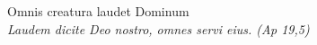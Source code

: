 


\def\greinitialformat#1{%
{\fontsize{39}{39}\selectfont #1}%
}




\vspace{0.3cm}
\begin{center}

Omnis creatura laudet Dominum\\
\textit{\small Laudem dicite Deo nostro, omnes servi eius. (Ap 19,5)}
\end{center}
